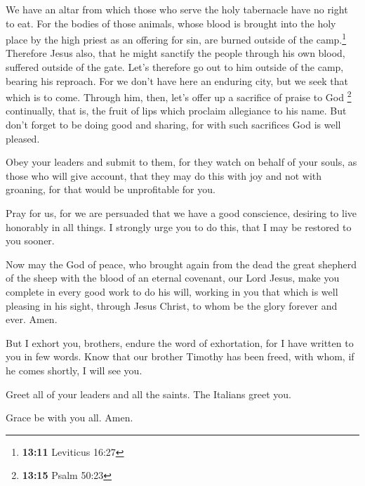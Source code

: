  We have an altar from which those who serve the holy
tabernacle have no right to eat.  For the bodies of those
animals, whose blood is brought into the holy place by the high priest
as an offering for sin, are burned outside of the camp.\footnote{\textbf{13:11}
  Leviticus 16:27}  Therefore Jesus also, that he might
sanctify the people through his own blood, suffered outside of the gate.
 Let's therefore go out to him outside of the camp,
bearing his reproach.  For we don't have here an enduring
city, but we seek that which is to come.  Through him,
then, let's offer up a sacrifice of praise to God \footnote{\textbf{13:15}
  Psalm 50:23} continually, that is, the fruit of lips which proclaim
allegiance to his name.  But don't forget to be doing
good and sharing, for with such sacrifices God is well pleased.

 Obey your leaders and submit to them, for they watch on
behalf of your souls, as those who will give account, that they may do
this with joy and not with groaning, for that would be unprofitable for
you.

 Pray for us, for we are persuaded that we have a good
conscience, desiring to live honorably in all things.  I
strongly urge you to do this, that I may be restored to you sooner.

 Now may the God of peace, who brought again from the
dead the great shepherd of the sheep with the blood of an eternal
covenant, our Lord Jesus,  make you complete in every
good work to do his will, working in you that which is well pleasing in
his sight, through Jesus Christ, to whom be the glory forever and ever.
Amen.

 But I exhort you, brothers, endure the word of
exhortation, for I have written to you in few words. 
Know that our brother Timothy has been freed, with whom, if he comes
shortly, I will see you.

 Greet all of your leaders and all the saints. The
Italians greet you.

 Grace be with you all. Amen.

